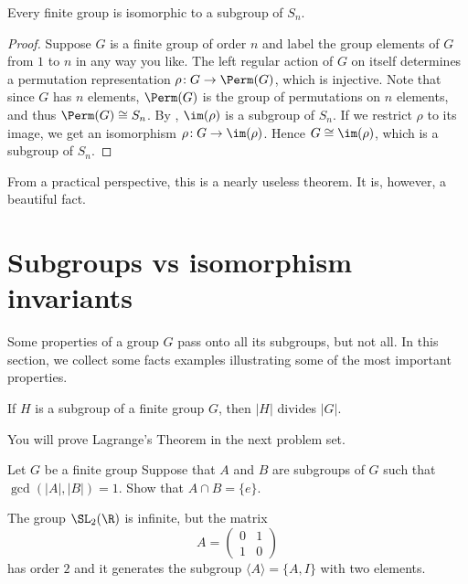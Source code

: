 \begin{theorem}
Every finite group is isomorphic to a subgroup of $S_n$. 
\end{theorem}

\begin{proof} 
Suppose $G$ is a finite group of order $n$ and label the group elements of $G$ from $1$ to $n$ in any way you like. The left regular action of $G$ on itself determines a permutation representation $\rho\!:G\to \Perm(G)$, which is injective. Note that since $G$ has $n$ elements, $\Perm(G)$ is the group of permutations on $n$ elements, and thus $\Perm(G) \cong S_n$. By , $\im(\rho)$ is a subgroup of $S_n$. If we restrict $\rho$ to its image, we get an isomorphism $\rho\!: G \to \im(\rho)$. Hence $G\cong \im(\rho)$, which is a subgroup of $S_n$. 
\end{proof}

\begin{remark}
From a practical perspective, this is a nearly useless theorem. It is, however, a beautiful fact.	
\end{remark}



\section{Subgroups vs isomorphism invariants}

Some properties of a group $G$ pass onto all its subgroups, but not all. In this section, we collect some facts examples illustrating some of the most important properties.



\begin{theorem}\label{Lagrange}
If $H$ is a subgroup of a finite group $G$, then $|H|$ divides $|G|$.
\end{theorem}

You will prove Lagrange's Theorem in the next problem set.


\begin{exercise}\label{intersection coprime subgroups is e}
	Let $G$ be a finite group Suppose that $A$ and $B$ are subgroups of $G$ such that $\gcd(|A|, |B|) = 1$. Show that $A \cap B = \{ e \}$.
\end{exercise}


\begin{example}\label{infinite group with infinite subgroup}
	The group $\SL_2(\R)$ is infinite, but the matrix
	$$A = \begin{pmatrix}
		0 & 1 \\ 1 & 0
	\end{pmatrix}$$
	has order $2$ and it generates the subgroup $\langle A \rangle = \{ A, I \}$ 	with two elements.
\end{example}


